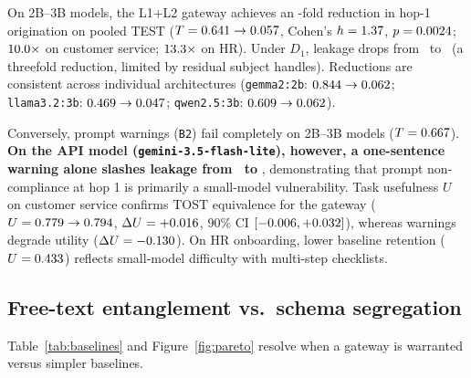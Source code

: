 \documentclass{article}
\begin{document}
On 2B--3B models, the L1+L2 gateway achieves an \TFoldReductionPooled-fold reduction in hop-1 origination on pooled TEST ($T = 0.641 \to 0.057$, Cohen's $h=1.37$, $p=0.0024$; $10.0\times$ on customer service; $13.3\times$ on HR). Under $D_1$, leakage drops from \TTestBZeroDOne\ to \TTestGatewayDOne\ (a threefold reduction, limited by residual subject handles). Reductions are consistent across individual architectures (\texttt{gemma2:2b}: $0.844 \to 0.062$; \texttt{llama3.2:3b}: $0.469 \to 0.047$; \texttt{qwen2.5:3b}: $0.609 \to 0.062$).

Conversely, prompt warnings (\texttt{B2}) fail completely on 2B--3B models ($T = 0.667$). \textbf{On the API model (\texttt{gemini-3.5-flash-lite}), however, a one-sentence warning alone slashes leakage from \TTestAPIBZero\ to \TTestAPIBTwo}, demonstrating that prompt non-compliance at hop 1 is primarily a small-model vulnerability. Task usefulness $U$ on customer service confirms TOST equivalence for the gateway ($U = 0.779 \to 0.794$, $\Delta U = +0.016$, 90\% CI $[-0.006, +0.032]$), whereas warnings degrade utility ($\Delta U = -0.130$). On HR onboarding, lower baseline retention ($U=0.433$) reflects small-model difficulty with multi-step checklists.

\subsection{Free-text entanglement vs.\ schema segregation}
Table~\ref{tab:baselines} and Figure~\ref{fig:pareto} resolve when a gateway is warranted versus simpler baselines.
\end{document}
